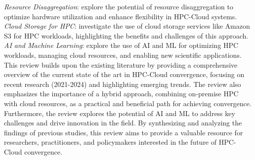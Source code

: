\noindent
\textit{Resource Disaggregation}: \cite{michelogiannakis_case_2022, copik_software_2024} explore the potential of resource disaggregation to optimize hardware utilization and enhance flexibility in HPC-Cloud systems.\\

\noindent
\textit{Cloud Storage for HPC}: \cite{gadban_analyzing_2022, guidi_10_2021} investigate the use of cloud storage services like Amazon S3 for HPC workloads, highlighting the benefits and challenges of this approach.\\

\noindent
\textit{AI and Machine Learning}: \cite{chahal_isesa_2022, michalewicz_attempt_2023, silva_review_2024} explore the use of AI and ML for optimizing HPC workloads, managing cloud resources, and enabling new scientific applications.\\

This review builds upon the existing literature by providing a comprehensive overview of the current state of the art in HPC-Cloud convergence, focusing on recent research (2021-2024) and highlighting emerging trends. The review also emphasizes the importance of a hybrid approach, combining on-premise HPC with cloud resources, as a practical and beneficial path for achieving convergence. Furthermore, the review explores the potential of AI and ML to address key challenges and drive innovation in the field.
By synthesizing and analyzing the findings of previous studies, this review aims to provide a valuable resource for researchers, practitioners, and policymakers interested in the future of HPC-Cloud convergence.

